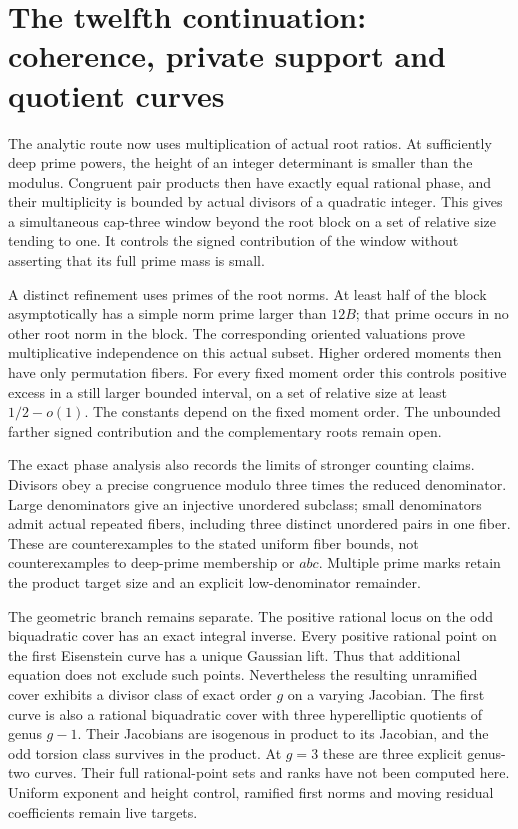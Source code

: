 \section{The twelfth continuation: coherence, private support and quotient curves}
\label{coherence-status-section}

The analytic route now uses multiplication of actual root ratios.
At sufficiently deep prime powers, the height of an integer determinant
is smaller than the modulus. Congruent pair products then have exactly
equal rational phase, and their multiplicity is bounded by actual
divisors of a quadratic integer. This gives a simultaneous cap-three
window beyond the root block on a set of relative size tending to one.
It controls the signed contribution of the window without asserting
that its full prime mass is small.

A distinct refinement uses primes of the root norms. At least half of
the block asymptotically has a simple norm prime larger than $12B$;
that prime occurs in no other root norm in the block. The corresponding
oriented valuations prove multiplicative independence on this actual
subset. Higher ordered moments then have only permutation fibers.
For every fixed moment order this controls positive excess in a still
larger bounded interval, on a set of relative size at least $1/2-o(1)$.
The constants depend on the fixed moment order. The unbounded farther
signed contribution and the complementary roots remain open.

The exact phase analysis also records the limits of stronger counting
claims. Divisors obey a precise congruence modulo three times the
reduced denominator. Large denominators give an injective unordered
subclass; small denominators admit actual repeated fibers, including
three distinct unordered pairs in one fiber. These are counterexamples
to the stated uniform fiber bounds, not counterexamples to deep-prime
membership or $abc$. Multiple prime marks retain the product target
size and an explicit low-denominator remainder.

The geometric branch remains separate. The positive rational locus
on the odd biquadratic cover has an exact integral inverse. Every
positive rational point on the first Eisenstein curve has a unique
Gaussian lift. Thus that additional equation does not exclude such
points. Nevertheless the resulting unramified cover exhibits a divisor
class of exact order $g$ on a varying Jacobian. The first curve is also
a rational biquadratic cover with three hyperelliptic quotients of
genus $g-1$. Their Jacobians are isogenous in product to its Jacobian,
and the odd torsion class survives in the product. At $g=3$ these are
three explicit genus-two curves. Their full rational-point sets and
ranks have not been computed here. Uniform exponent and height control,
ramified first norms and moving residual coefficients remain live targets.

